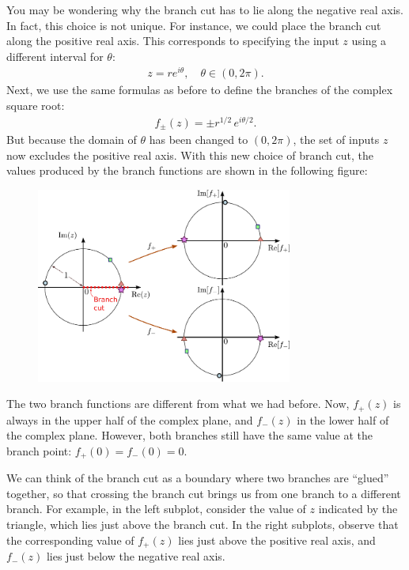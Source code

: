 \documentclass[10pt,a4paper]{article}
\begin{document}
You may be wondering why the branch cut has to lie along the negative
real axis. In fact, this choice is not unique. For instance, we could
place the branch cut along the positive real axis. This corresponds to
specifying the input $z$ using a different interval for $\theta$:
\begin{align}
  z = re^{i\theta}, \quad \theta \in (0, 2\pi).
\end{align}
Next, we use the same formulas as before to define the branches of the
complex square root:
\begin{align}
  f_\pm(z) = \pm r^{1/2} \, e^{i\theta/2}.
\end{align}
But because the domain of $\theta$ has been changed to $(0, 2\pi)$,
the set of inputs $z$ now excludes the positive real axis. With this
new choice of branch cut, the values produced by the branch functions
are shown in the following figure:

\begin{figure}[h]
  \centering\includegraphics[width=0.75\textwidth]{complex_root_2}
\end{figure}

The two branch functions are different from what we had before.  Now,
$f_+(z)$ is always in the upper half of the complex plane, and
$f_-(z)$ in the lower half of the complex plane. However, both
branches still have the same value at the branch point: $f_+(0) =
f_-(0) = 0$.

We can think of the branch cut as a boundary where two branches are
``glued'' together, so that crossing the branch cut brings us from one
branch to a different branch.  For example, in the left subplot,
consider the value of $z$ indicated by the triangle, which lies just
above the branch cut.  In the right subplots, observe that the
corresponding value of $f_+(z)$ lies just above the positive real
axis, and $f_-(z)$ lies just below the negative real axis.
\end{document}
